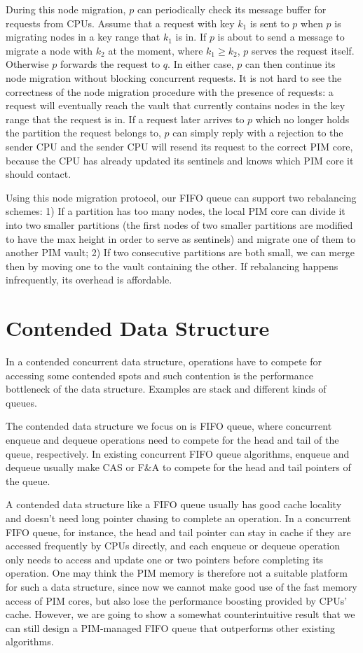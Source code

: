 \documentclass[11pt]{article}
\begin{document}
During this node migration, $p$ can periodically check its message buffer for requests from CPUs.
Assume that a request with key $k_1$ is sent to $p$ when $p$ is migrating nodes 
in a key range that $k_1$ is in.  
If $p$ is about to send a message to migrate a node with $k_2$ at the moment, where $k_1 \ge k_2$, 
$p$ serves the request itself. 
Otherwise $p$ forwards the request to $q$. 
In either case, $p$ can then continue its node migration without blocking concurrent requests. 
It is not hard to see the correctness of the node migration procedure 
with the presence of requests: a request will eventually reach the vault that 
currently contains nodes in the key range that the request is in.
If a request later arrives to $p$ which no longer holds the partition the request belongs to, 
$p$ can simply reply with a rejection to the sender CPU and 
the sender CPU will resend its request to the correct PIM core, 
because the CPU has already updated its sentinels and knows which PIM core it should contact. 

Using this node migration protocol, our FIFO queue can support two rebalancing schemes:
1) If a partition has too many nodes, the local PIM core can divide it into two smaller  
partitions (the first nodes of two smaller partitions are modified to have the max height 
in order to serve as sentinels) and migrate one of them to another PIM vault; 
2) If two consecutive partitions are both small, we can merge then by moving one to the vault 
containing the other. 
If rebalancing happens infrequently, its overhead is affordable. 


\section{Contended Data Structure}
\label{section:contended}
In a contended concurrent data structure, operations have to compete for
accessing some contended spots and
such contention is the performance bottleneck of the data structure.
Examples are stack and different kinds of queues.

The contended data structure we focus on is FIFO queue, where concurrent enqueue
and dequeue operations need to compete for the head and tail of the queue, respectively.
In existing concurrent FIFO queue algorithms, enqueue and dequeue usually
make CAS or F\&A to compete for the head and tail pointers of the queue.

A contended data structure like a FIFO queue usually has good cache locality
and doesn't need long pointer chasing to complete an operation.
In a concurrent FIFO queue, for instance, the head and tail pointer can stay in
cache if they are accessed frequently by CPUs directly, and each enqueue or dequeue
operation only needs to access and update one or two pointers before completing its operation.
One may think the PIM memory is therefore not a suitable platform for such a data structure,
since now we cannot make good use of the fast memory access of PIM cores, but also
lose the performance boosting provided by CPUs' cache.
However, we are going to show a somewhat counterintuitive result that we can still design
a PIM-managed FIFO queue that outperforms other existing algorithms.
\end{document}
